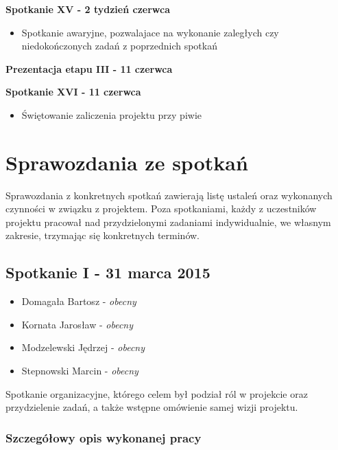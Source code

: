 \par{\textbf{Spotkanie XV - 2 tydzień czerwca}}

\begin{itemize}
\item Spotkanie awaryjne, pozwalajace na wykonanie zaległych czy niedokończonych zadań z poprzednich spotkań
\end{itemize}

\par{\textbf{Prezentacja etapu III - 11 czerwca}}

\par{\textbf{Spotkanie XVI - 11 czerwca}}
\begin{itemize}
\item Świętowanie zaliczenia projektu przy piwie
\end{itemize}

\section[Sprawozdania ze spotkań]{Sprawozdania ze spotkań}

\par{Sprawozdania z konkretnych spotkań zawierają listę ustaleń oraz wykonanych czynności w związku z projektem. Poza spotkaniami, każdy z uczestników projektu pracował nad przydzielonymi zadaniami indywidualnie, we własnym zakresie, trzymając się konkretnych terminów.}

\subsection[Spotkanie I - 31 marca 2015]{Spotkanie I - 31 marca 2015}

\begin{itemize}
\item Domagała Bartosz - \textit{obecny}
\item Kornata Jarosław - \textit{obecny}
\item Modzelewski Jędrzej - \textit{obecny}
\item Stepnowski Marcin - \textit{obecny}
\end{itemize}

\par{Spotkanie organizacyjne, którego celem był podział ról w projekcie oraz przydzielenie zadań, a także wstępne omówienie samej wizji projektu.}


\subsubsection*[Szczegółowy opis wykonanej pracy]{Szczegółowy opis wykonanej pracy}

